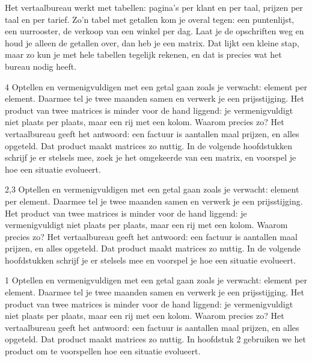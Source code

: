Het vertaalbureau werkt met tabellen: pagina's per klant en per taal, prijzen per taal en per tarief. Zo'n tabel met getallen kom je overal tegen: een puntenlijst, een uurrooster, de verkoop van een winkel per dag. Laat je de opschriften weg en houd je alleen de getallen over, dan heb je een matrix. Dat lijkt een kleine stap, maar zo kun je met hele tabellen tegelijk rekenen, en dat is precies wat het bureau nodig heeft.

\begin{alleenvoor}{4}
Optellen en vermenigvuldigen met een getal gaan zoals je verwacht: element per element. Daarmee tel je twee maanden samen en verwerk je een prijsstijging. Het product van twee matrices is minder voor de hand liggend: je vermenigvuldigt niet plaats per plaats, maar een rij met een kolom. Waarom precies zo? Het vertaalbureau geeft het antwoord: een factuur is aantallen maal prijzen, en alles opgeteld. Dat product maakt matrices zo nuttig. In de volgende hoofdstukken schrijf je er stelsels mee, zoek je het omgekeerde van een matrix, en voorspel je hoe een situatie evolueert.
\end{alleenvoor}
\begin{alleenvoor}{2,3}
Optellen en vermenigvuldigen met een getal gaan zoals je verwacht: element per element. Daarmee tel je twee maanden samen en verwerk je een prijsstijging. Het product van twee matrices is minder voor de hand liggend: je vermenigvuldigt niet plaats per plaats, maar een rij met een kolom. Waarom precies zo? Het vertaalbureau geeft het antwoord: een factuur is aantallen maal prijzen, en alles opgeteld. Dat product maakt matrices zo nuttig. In de volgende hoofdstukken schrijf je er stelsels mee en voorspel je hoe een situatie evolueert.
\end{alleenvoor}
\begin{alleenvoor}{1}
Optellen en vermenigvuldigen met een getal gaan zoals je verwacht: element per element. Daarmee tel je twee maanden samen en verwerk je een prijsstijging. Het product van twee matrices is minder voor de hand liggend: je vermenigvuldigt niet plaats per plaats, maar een rij met een kolom. Waarom precies zo? Het vertaalbureau geeft het antwoord: een factuur is aantallen maal prijzen, en alles opgeteld. Dat product maakt matrices zo nuttig. In hoofdstuk 2 gebruiken we het product om te voorspellen hoe een situatie evolueert.
\end{alleenvoor}

\begin{oefeningen}[Start]

\end{oefeningen}

